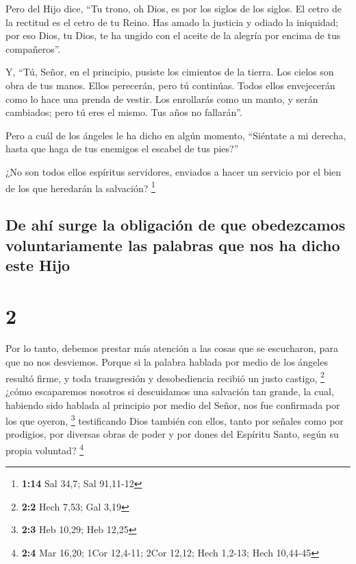  Pero del Hijo dice, ``Tu trono, oh Dios, es por los
siglos de los siglos. El cetro de la rectitud es el cetro de tu Reino.
 Has amado la justicia y odiado la iniquidad; por eso
Dios, tu Dios, te ha ungido con el aceite de la alegría por encima de
tus compañeros''.

 Y, ``Tú, Señor, en el principio, pusiste los cimientos
de la tierra. Los cielos son obra de tus manos.  Ellos
perecerán, pero tú continúas. Todos ellos envejecerán como lo hace una
prenda de vestir.  Los enrollarás como un manto, y serán
cambiados; pero tú eres el mismo. Tus años no fallarán''.

 Pero a cuál de los ángeles le ha dicho en algún momento,
``Siéntate a mi derecha, hasta que haga de tus enemigos el escabel de
tus pies?''

 ¿No son todos ellos espíritus servidores, enviados a
hacer un servicio por el bien de los que heredarán la salvación?
\footnote{\textbf{1:14} Sal 34,7; Sal 91,11-12}

\hypertarget{de-ahuxed-surge-la-obligaciuxf3n-de-que-obedezcamos-voluntariamente-las-palabras-que-nos-ha-dicho-este-hijo}{%
\subsection{De ahí surge la obligación de que obedezcamos
voluntariamente las palabras que nos ha dicho este
Hijo}\label{de-ahuxed-surge-la-obligaciuxf3n-de-que-obedezcamos-voluntariamente-las-palabras-que-nos-ha-dicho-este-hijo}}

\hypertarget{section-1}{%
\section{2}\label{section-1}}

 Por lo tanto, debemos prestar más atención a las cosas
que se escucharon, para que no nos desviemos.  Porque si
la palabra hablada por medio de los ángeles resultó firme, y toda
transgresión y desobediencia recibió un justo castigo, \footnote{\textbf{2:2}
  Hech 7,53; Gal 3,19}  ¿cómo escaparemos nosotros si
descuidamos una salvación tan grande, la cual, habiendo sido hablada al
principio por medio del Señor, nos fue confirmada por los que oyeron,
\footnote{\textbf{2:3} Heb 10,29; Heb 12,25}  testificando
Dios también con ellos, tanto por señales como por prodigios, por
diversas obras de poder y por dones del Espíritu Santo, según su propia
voluntad? \footnote{\textbf{2:4} Mar 16,20; 1Cor 12,4-11; 2Cor 12,12;
  Hech 1,2-13; Hech 10,44-45}

